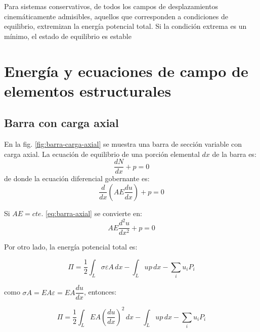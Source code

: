\begin{kaobox}[frametitle=Principio de mínima energía potencial]
	Para sistemas conservativos, de todos los campos de desplazamientos cinemáticamente admisibles, aquellos que corresponden a condiciones de equilibrio, extremizan la energía potencial total. Si la condición extrema es un mínimo, el estado de equilibrio es estable
\end{kaobox}

\section{Energía y ecuaciones de campo de elementos estructurales}

\subsection{Barra con carga axial}

En la fig. \ref{fig:barra-carga-axial} se muestra una barra de sección variable con carga axial. La ecuación de equilibrio de una porción elemental $dx$ de la barra es:
\begin{equation}
	\dfrac{dN}{dx} + p = 0
	\label{dNdx}
\end{equation}
de donde la ecuación diferencial gobernante es:
\begin{equation}
	\dfrac{d}{dx} \left( AE \dfrac{du}{dx} \right) + p = 0
	\label{eq:barra-axial}
\end{equation}

Si $AE = cte.$ \eqref{eq:barra-axial} se convierte en:
\begin{equation}
	AE \dfrac{d^2u}{dx^2} + p = 0
\end{equation}

Por otro lado, la energía potencial total es:

\begin{equation}
	\Pi = \dfrac{1}{2} \int_L \sigma \varepsilon A \, dx - \int_L up\, dx - \sum_i u_i P_i
	\label{eq:energia_unidimensionales}
\end{equation}

como $\sigma A = EA \varepsilon = EA \dfrac{du}{dx}$, entonces:

\begin{equation}
	\Pi = \dfrac{1}{2} \int_L EA \left( \dfrac{du}{dx} \right)^2 \, dx - \int_L up\, dx - \sum_i u_i P_i
	\label{eq:eptuni}
\end{equation}

